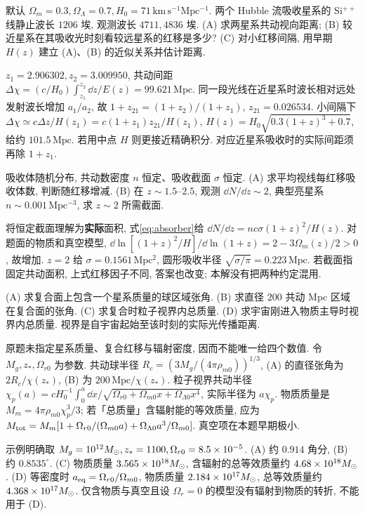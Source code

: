 \begin{exercise}
默认 $\Omega_m=0.3,\Omega_\Lambda=0.7,H_0=71\,\mathrm{km\,s^{-1}Mpc^{-1}}$. 两个 Hubble 流吸收星系的 Si$^{++}$ 线静止波长 $1206$ 埃, 观测波长 $4711,4836$ 埃.
(A) 求两星系共动视向距离; (B) 较近星系在其吸收光时刻看较远星系的红移是多少?
(C) 对小红移间隔, 用早期 $H(z)$ 建立 (A)、(B) 的近似关系并估计距离.
\end{exercise}
\begin{solution}
$z_1=2.906302,z_2=3.009950$, 共动间距 $\Delta\chi=(c/H_0)\int_{z_1}^{z_2}\dd z/E(z)=99.621\,\mathrm{Mpc}$. 同一段光线在近星系时波长相对远处发射波长增加 $a_1/a_2$, 故 $1+z_{21}=(1+z_2)/(1+z_1)$, $z_{21}=0.026534$. 小间隔下 $\Delta\chi\simeq c\Delta z/H(z_1)=c(1+z_1)z_{21}/H(z_1)$, $H(z)=H_0\sqrt{0.3(1+z)^3+0.7}$, 给约 $101.5\,\mathrm{Mpc}$. 若用中点 $H$ 则更接近精确积分. 对应近星系吸收时的实际间距须再除 $1+z_1$.
\end{solution}

\begin{exercise}
吸收体随机分布, 共动数密度 $n$ 恒定、吸收截面 $\sigma$ 恒定.
(A) 求平均视线每红移吸收体数, 判断随红移增减.
(B) 在 $z\sim1.5$--$2.5$, 观测 $\dd N/\dd z\sim2$, 典型亮星系 $n\sim0.001\,\mathrm{Mpc^{-3}}$, 求 $z\sim2$ 所需截面.
\end{exercise}
\begin{solution}
将恒定截面理解为\textbf{实际}面积, 式\eqref{eq:absorber}给 $\dd N/\dd z=nc\sigma(1+z)^2/H(z)$. 对题面的物质和真空模型, $\dd\ln[(1+z)^2/H]/\dd\ln(1+z)=2-3\Omega_m(z)/2>0$, 故增加. $z=2$ 给 $\sigma=0.1561\,\mathrm{Mpc^2}$, 圆形吸收半径 $\sqrt{\sigma/\pi}=0.223\,\mathrm{Mpc}$. 若截面指固定共动面积, 上式红移因子不同, 答案也改变; 本解没有把两种约定混用.
\end{solution}

\begin{exercise}
(A) 求复合面上包含一个星系质量的球区域张角.
(B) 求直径 $200$ 共动 Mpc 区域在复合面的张角.
(C) 求复合时粒子视界内总质量.
(D) 求宇宙刚进入物质主导时视界内总质量. 视界是自宇宙起始至该时刻的实际光传播距离.
\end{exercise}
\begin{solution}
原题未指定星系质量、复合红移与辐射密度, 因而不能唯一给四个数值. 令 $M_g,z_*,\Omega_{r0}$ 为参数. 共动球半径 $R_c=(3M_g/(4\pi\rho_{m0}))^{1/3}$, (A) 的直径张角为 $2R_c/\chi(z_*)$, (B) 为 $200\,\mathrm{Mpc}/\chi(z_*)$. 粒子视界共动半径
$\chi_p(a)=cH_0^{-1}\int_0^a\dd x/\sqrt{\Omega_{r0}+\Omega_{m0}x+\Omega_{\Lambda0}x^4}$,
实际半径为 $a\chi_p$. 物质质量是 $M_m=4\pi\rho_{m0}\chi_p^3/3$; 若「总质量」含辐射能的等效质量, 应为 $M_{\rm tot}=M_m[1+\Omega_{r0}/(\Omega_{m0}a)+\Omega_{\Lambda0}a^3/\Omega_{m0}]$. 真空项在本题早期极小.

示例明确取 $M_g=10^{12}M_{\odot},z_*=1100,\Omega_{r0}=8.5\times10^{-5}$. (A) 约 $0.914$ 角分, (B) 约 $0.8535^\circ$. (C) 物质质量 $3.565\times10^{18}M_{\odot}$, 含辐射的总等效质量约 $4.68\times10^{18}M_{\odot}$. (D) 等密度时 $a_{\rm eq}=\Omega_{r0}/\Omega_{m0}$, 物质质量 $2.184\times10^{17}M_{\odot}$, 总等效质量约 $4.368\times10^{17}M_{\odot}$. 仅含物质与真空且设 $\Omega_r=0$ 的模型没有辐射到物质的转折, 不能用于 (D).
\end{solution}

